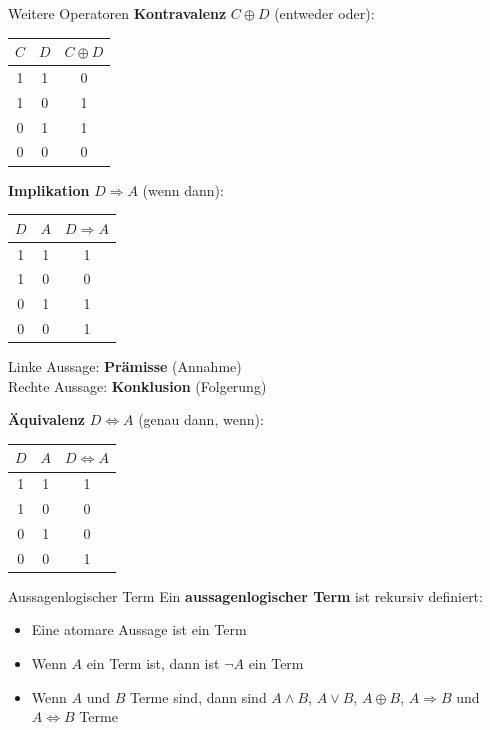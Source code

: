 \documentclass[a4paper, fontsize=7pt]{scrartcl}
\begin{document}
\begin{mainbox}{Weitere Operatoren}
\textbf{Kontravalenz} $C \oplus D$ (entweder oder):
\begin{center}
\begin{tabular}{cc|c}
$C$ & $D$ & $C \oplus D$ \\
\hline
1 & 1 & 0 \\
1 & 0 & 1 \\
0 & 1 & 1 \\
0 & 0 & 0
\end{tabular}
\end{center}

\textbf{Implikation} $D \Rightarrow A$ (wenn dann):
\begin{center}
\begin{tabular}{cc|c}
$D$ & $A$ & $D \Rightarrow A$ \\
\hline
1 & 1 & 1 \\
1 & 0 & 0 \\
0 & 1 & 1 \\
0 & 0 & 1
\end{tabular}
\end{center}
Linke Aussage: \textbf{Prämisse} (Annahme)\\
Rechte Aussage: \textbf{Konklusion} (Folgerung)

\textbf{Äquivalenz} $D \Leftrightarrow A$ (genau dann, wenn):
\begin{center}
\begin{tabular}{cc|c}
$D$ & $A$ & $D \Leftrightarrow A$ \\
\hline
1 & 1 & 1 \\
1 & 0 & 0 \\
0 & 1 & 0 \\
0 & 0 & 1
\end{tabular}
\end{center}
\end{mainbox}

\begin{mainbox}{Aussagenlogischer Term}
Ein \textbf{aussagenlogischer Term} ist rekursiv definiert:
\begin{itemize}
    \item Eine atomare Aussage ist ein Term
    \item Wenn $A$ ein Term ist, dann ist $\neg A$ ein Term
    \item Wenn $A$ und $B$ Terme sind, dann sind $A \land B$, $A \lor B$, $A \oplus B$, $A \Rightarrow B$ und $A \Leftrightarrow B$ Terme
\end{itemize}
\end{mainbox}
\end{document}
